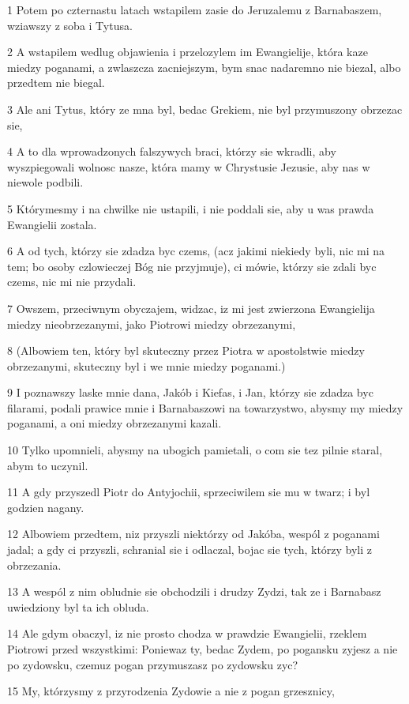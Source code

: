 \par 1 Potem po czternastu latach wstapilem zasie do Jeruzalemu z Barnabaszem, wziawszy z soba i Tytusa.
\par 2 A wstapilem wedlug objawienia i przelozylem im Ewangielije, która kaze miedzy poganami, a zwlaszcza zacniejszym, bym snac nadaremno nie biezal, albo przedtem nie biegal.
\par 3 Ale ani Tytus, który ze mna byl, bedac Grekiem, nie byl przymuszony obrzezac sie,
\par 4 A to dla wprowadzonych falszywych braci, którzy sie wkradli, aby wyszpiegowali wolnosc nasze, która mamy w Chrystusie Jezusie, aby nas w niewole podbili.
\par 5 Którymesmy i na chwilke nie ustapili, i nie poddali sie, aby u was prawda Ewangielii zostala.
\par 6 A od tych, którzy sie zdadza byc czems, (acz jakimi niekiedy byli, nic mi na tem; bo osoby czlowieczej Bóg nie przyjmuje), ci mówie, którzy sie zdali byc czems, nic mi nie przydali.
\par 7 Owszem, przeciwnym obyczajem, widzac, iz mi jest zwierzona Ewangielija miedzy nieobrzezanymi, jako Piotrowi miedzy obrzezanymi,
\par 8 (Albowiem ten, który byl skuteczny przez Piotra w apostolstwie miedzy obrzezanymi, skuteczny byl i we mnie miedzy poganami.)
\par 9 I poznawszy laske mnie dana, Jakób i Kiefas, i Jan, którzy sie zdadza byc filarami, podali prawice mnie i Barnabaszowi na towarzystwo, abysmy my miedzy poganami, a oni miedzy obrzezanymi kazali.
\par 10 Tylko upomnieli, abysmy na ubogich pamietali, o com sie tez pilnie staral, abym to uczynil.
\par 11 A gdy przyszedl Piotr do Antyjochii, sprzeciwilem sie mu w twarz; i byl godzien nagany.
\par 12 Albowiem przedtem, niz przyszli niektórzy od Jakóba, wespól z poganami jadal; a gdy ci przyszli, schranial sie i odlaczal, bojac sie tych, którzy byli z obrzezania.
\par 13 A wespól z nim obludnie sie obchodzili i drudzy Zydzi, tak ze i Barnabasz uwiedziony byl ta ich obluda.
\par 14 Ale gdym obaczyl, iz nie prosto chodza w prawdzie Ewangielii, rzeklem Piotrowi przed wszystkimi: Poniewaz ty, bedac Zydem, po pogansku zyjesz a nie po zydowsku, czemuz pogan przymuszasz po zydowsku zyc?
\par 15 My, którzysmy z przyrodzenia Zydowie a nie z pogan grzesznicy,
